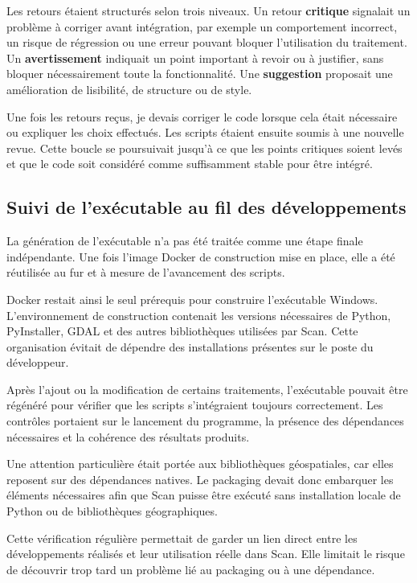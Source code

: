 Les retours étaient structurés selon trois niveaux. Un retour \textbf{critique}
signalait un problème à corriger avant intégration, par exemple un comportement
incorrect, un risque de régression ou une erreur pouvant bloquer l'utilisation
du traitement. Un \textbf{avertissement} indiquait un point important à revoir ou
à justifier, sans bloquer nécessairement toute la fonctionnalité. Une
\textbf{suggestion} proposait une amélioration de lisibilité, de structure ou de
style.

Une fois les retours reçus, je devais corriger le code lorsque cela était
nécessaire ou expliquer les choix effectués. Les scripts étaient ensuite soumis
à une nouvelle revue. Cette boucle se poursuivait jusqu'à ce que les points
critiques soient levés et que le code soit considéré comme suffisamment stable
pour être intégré.


\subsection{Suivi de l'exécutable au fil des développements}
\label{subsec:reutilisation_docker_verification_executable}

La génération de l'exécutable n'a pas été traitée comme une étape finale
indépendante. Une fois l'image Docker de construction mise en place, elle a été
réutilisée au fur et à mesure de l'avancement des scripts.

Docker restait ainsi le seul prérequis pour construire l'exécutable Windows.
L'environnement de construction contenait les versions nécessaires de Python,
PyInstaller, GDAL et des autres bibliothèques utilisées par Scan. Cette
organisation évitait de dépendre des installations présentes sur le poste du
développeur.

Après l'ajout ou la modification de certains traitements, l'exécutable pouvait
être régénéré pour vérifier que les scripts s'intégraient toujours correctement.
Les contrôles portaient sur le lancement du programme, la présence des
dépendances nécessaires et la cohérence des résultats produits.

Une attention particulière était portée aux bibliothèques géospatiales, car
elles reposent sur des dépendances natives. Le packaging devait donc embarquer
les éléments nécessaires afin que Scan puisse être exécuté sans installation
locale de Python ou de bibliothèques géographiques.

Cette vérification régulière permettait de garder un lien direct entre les
développements réalisés et leur utilisation réelle dans Scan. Elle limitait le
risque de découvrir trop tard un problème lié au packaging ou à une dépendance.
